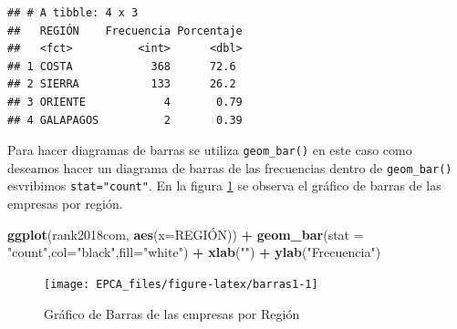 \documentclass[letterpaper,]{book}
\newenvironment{Shaded}{\begin{snugshade}}{\end{snugshade}}
\newcommand{\DataTypeTok}[1]{\textcolor[rgb]{0.13,0.29,0.53}{#1}}
\newcommand{\DecValTok}[1]{\textcolor[rgb]{0.00,0.00,0.81}{#1}}
\newcommand{\KeywordTok}[1]{\textcolor[rgb]{0.13,0.29,0.53}{\textbf{#1}}}
\newcommand{\NormalTok}[1]{#1}
\newcommand{\OperatorTok}[1]{\textcolor[rgb]{0.81,0.36,0.00}{\textbf{#1}}}
\newcommand{\StringTok}[1]{\textcolor[rgb]{0.31,0.60,0.02}{#1}}
\begin{document}
\begin{Shaded}
\end{Shaded}

\begin{verbatim}
## # A tibble: 4 x 3
##   REGIÓN    Frecuencia Porcentaje
##   <fct>          <int>      <dbl>
## 1 COSTA            368      72.6 
## 2 SIERRA           133      26.2 
## 3 ORIENTE            4       0.79
## 4 GALAPAGOS          2       0.39
\end{verbatim}

Para hacer diagramas de barras se utiliza \texttt{geom\_bar()} en este caso como deseamos hacer un diagrama de barras de las frecuencias dentro de \texttt{geom\_bar()} esvribimos \texttt{stat="count"}. En la figura \ref{fig:barras1} se observa el gráfico de barras de las empresas por región.

\begin{Shaded}
\begin{Highlighting}[]
\KeywordTok{ggplot}\NormalTok{(rank2018com, }\KeywordTok{aes}\NormalTok{(}\DataTypeTok{x=}\NormalTok{REGIÓN)) }\OperatorTok{+}\StringTok{ }
\StringTok{  }\KeywordTok{geom_bar}\NormalTok{(}\DataTypeTok{stat =} \StringTok{"count"}\NormalTok{,}\DataTypeTok{col=}\StringTok{"black"}\NormalTok{,}\DataTypeTok{fill=}\StringTok{"white"}\NormalTok{) }\OperatorTok{+}
\StringTok{  }\KeywordTok{xlab}\NormalTok{(}\StringTok{""}\NormalTok{) }\OperatorTok{+}\StringTok{ }\KeywordTok{ylab}\NormalTok{(}\StringTok{"Frecuencia"}\NormalTok{)}
\end{Highlighting}
\end{Shaded}

\begin{figure}[h!]

{\centering \texttt{[image: EPCA\_files/figure-latex/barras1-1]} 

}

\caption{Gráfico de Barras de las empresas por Región}\label{fig:barras1}
\end{figure}
\end{document}

